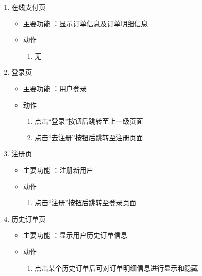 \begin{enumerate}
    \item 在线支付页
    \begin{itemize}
        \item {主要功能} ：显示订单信息及订单明细信息
        \item 动作
        \begin{enumerate}
            \item 无
        \end{enumerate}
    \end{itemize}

    \item 登录页
    \begin{itemize}
        \item {主要功能} ：用户登录
        \item 动作
        \begin{enumerate}
            \item 点击“登录”按钮后跳转至上一级页面
            \item 点击“去注册”按钮后跳转至注册页面
        \end{enumerate}
    \end{itemize}

    \item 注册页
    \begin{itemize}
        \item {主要功能} ：注册新用户
        \item 动作
        \begin{enumerate}
            \item 点击“注册”按钮后跳转至登录页面
        \end{enumerate}
    \end{itemize}

    \item 历史订单页
    \begin{itemize}
        \item {主要功能} ：显示用户历史订单信息
        \item 动作
        \begin{enumerate}
            \item 点击某个历史订单后可对订单明细信息进行显示和隐藏
        \end{enumerate}
    \end{itemize}
\end{enumerate}

